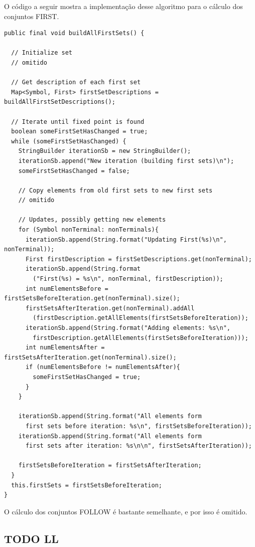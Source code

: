 \documentclass[11pt]{article}
\begin{document}
O código a seguir mostra a implementação desse algoritmo para o cálculo dos
conjuntos FIRST.

\begin{verbatim}
public final void buildAllFirstSets() {

  // Initialize set
  // omitido

  // Get description of each first set
  Map<Symbol, First> firstSetDescriptions = buildAllFirstSetDescriptions();

  // Iterate until fixed point is found
  boolean someFirstSetHasChanged = true;
  while (someFirstSetHasChanged) {
    StringBuilder iterationSb = new StringBuilder();
    iterationSb.append("New iteration (building first sets)\n");
    someFirstSetHasChanged = false;

    // Copy elements from old first sets to new first sets
    // omitido

    // Updates, possibly getting new elements
    for (Symbol nonTerminal: nonTerminals){
      iterationSb.append(String.format("Updating First(%s)\n", nonTerminal));
      First firstDescription = firstSetDescriptions.get(nonTerminal);
      iterationSb.append(String.format
        ("First(%s) = %s\n", nonTerminal, firstDescription));
      int numElementsBefore = firstSetsBeforeIteration.get(nonTerminal).size();
      firstSetsAfterIteration.get(nonTerminal).addAll
        (firstDescription.getAllElements(firstSetsBeforeIteration));
      iterationSb.append(String.format("Adding elements: %s\n", 
        firstDescription.getAllElements(firstSetsBeforeIteration)));
      int numElementsAfter = firstSetsAfterIteration.get(nonTerminal).size();
      if (numElementsBefore != numElementsAfter){
        someFirstSetHasChanged = true;
      }
    }

    iterationSb.append(String.format("All elements form
      first sets before iteration: %s\n", firstSetsBeforeIteration));
    iterationSb.append(String.format("All elements form
      first sets after iteration: %s\n\n", firstSetsAfterIteration));

    firstSetsBeforeIteration = firstSetsAfterIteration;
  }
  this.firstSets = firstSetsBeforeIteration;
}
\end{verbatim}

O cálculo dos conjuntos FOLLOW é bastante semelhante, e por isso é omitido.

\subsection{{\bfseries\sffamily TODO} LL}
\label{sec:orgheadline9}
\end{document}
